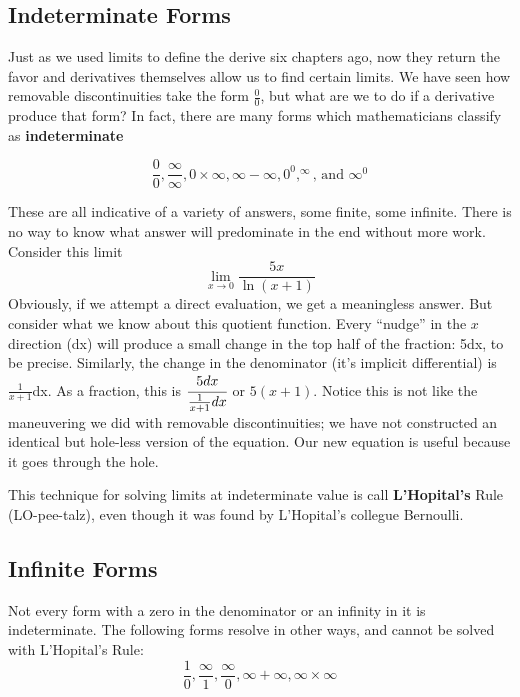 
\subsection{Indeterminate Forms}



Just as we used limits to define the derive six chapters ago, now they return the favor
and derivatives themselves allow us to find certain limits.  We have seen how removable
discontinuities take the form $\frac{0}{0}$, but what are we to do if a derivative
produce that form?  In fact, there are many forms which mathematicians classify
as \textbf{indeterminate}

$$
\frac{0}{0} , \frac{\infty}{\infty} , 0\times\infty , \infty-\infty , 0^0 , ^\infty \text{, and } \infty^0 
$$

These are all indicative of a variety of answers, some finite, some infinite.  There is
no way to know what answer will predominate in the end without more work.
Consider this limit
\begin{equation}
\lim_{x\rightarrow0}\frac{5x}{\ln(x+1)}
\end{equation}
Obviously, if we attempt a direct evaluation, we get a meaningless answer.  But
consider what we know about this quotient function.  Every ``nudge'' in the $x$
direction (dx) will produce a small change in the top half of the fraction: 5dx, to
be precise.  Similarly, the change in the denominator (it's implicit differential)
is $\frac{1}{x+1}$dx.  As a fraction, this is $\cfrac{5dx}{\frac{1}{x+1}dx}$ or 
$5(x+1)$.  Notice this is not like the maneuvering we did with removable 
discontinuities; we have not constructed an identical but hole-less version
of the equation.  Our new equation is useful because it goes through the hole.


This technique for solving limits at indeterminate value is call \textbf{L'Hopital's}
Rule (LO-pee-talz), even though it was found by L'Hopital's collegue Bernoulli.

\subsection{Infinite Forms}
Not every form with a zero in the denominator or an infinity in it is indeterminate.
The following forms resolve in other ways, and cannot be solved with L'Hopital's
Rule:
$$
\frac{1}{0} , \frac{\infty}{1} , \frac{\infty}{0} , \infty + \infty , \infty \times\infty
$$

